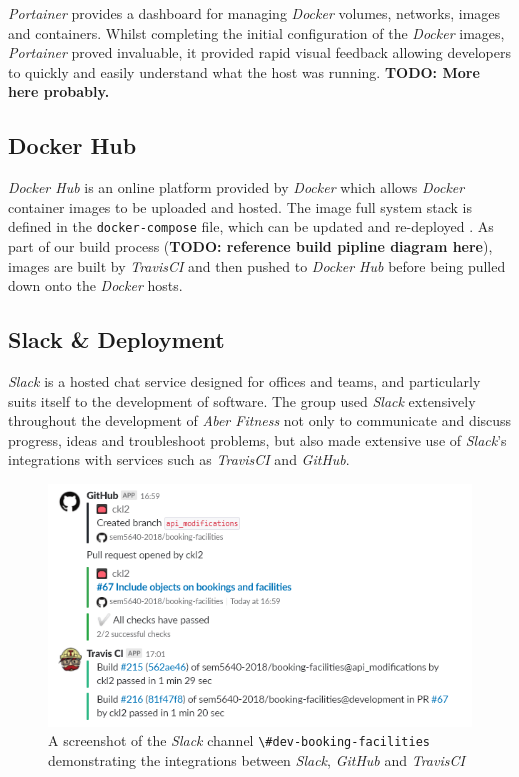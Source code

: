 \textit{Portainer} provides a dashboard for managing \textit{Docker} volumes, networks, images and containers. Whilst completing the initial configuration of the \textit{Docker} images, \textit{Portainer} proved invaluable, it provided rapid visual feedback allowing developers to quickly and easily understand what the host was running. \textbf{TODO: More here probably.}

\subsection{Docker Hub}
\textit{Docker Hub} is an online platform provided by \textit{Docker} which allows \textit{Docker} container images to be uploaded and hosted. The image full system stack is defined in the \lstinline{docker-compose} file, which can be updated and re-deployed . As part of our build process (\textbf{TODO: reference build pipline diagram here}), images are built by \textit{TravisCI} and then pushed to \textit{Docker Hub} before being pulled down onto the \textit{Docker} hosts.


\subsection{Slack \& Deployment}
\textit{Slack} is a hosted chat service designed for offices and teams, and particularly suits itself to the development of software. The group used \textit{Slack} extensively throughout the development of \textit{Aber Fitness} not only to communicate and discuss progress, ideas and troubleshoot problems, but also made extensive use of \textit{Slack}'s integrations with services such as \textit{TravisCI} and \textit{GitHub}. 

\begin{figure}[H]
    \centering
    \includegraphics[width=\textwidth]{Images/Slack_Travis_GitHub.png}
    \caption{A screenshot of the \textit{Slack} channel \lstinline{\#dev-booking-facilities} demonstrating the integrations between \textit{Slack}, \textit{GitHub} and \textit{TravisCI}}
\end{figure}

